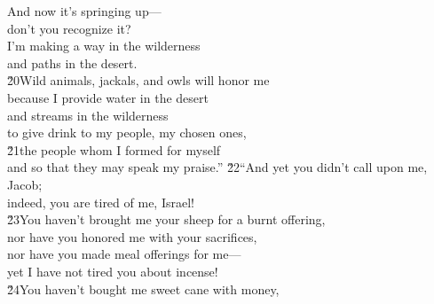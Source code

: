 \begin{poetry}
\poemll    And now it's springing up--- \\
\poemlll       don't you recognize it? \\
\poeml I'm making a way in the wilderness \\
\poemll    and paths in the desert. \\
\poeml \v{20}Wild animals, jackals, and owls will honor me \\
\poemll    because I provide water in the desert \\
\poeml and streams in the wilderness \\
\poemll    to give drink to my people, my chosen ones, \\
\poeml \v{21}the people whom I formed for myself \\
\poemll    and so that they may speak my praise.''
\poeml \v{22}``And yet you didn't call upon me, Jacob; \\
\poemll    indeed, you are tired of me, Israel! \\
\poeml \v{23}You haven't brought me your sheep for a burnt offering, \\
\poemll    nor have you honored me with your sacrifices, \\
\poeml nor have you made meal offerings for me--- \\
\poemll    yet I have not tired you about incense! \\
\poeml \v{24}You haven't bought me sweet cane with money, \\

\end{poetry}
